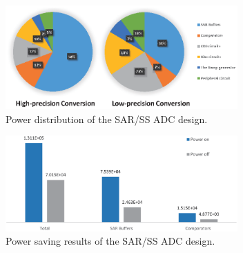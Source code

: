 \begin{figure}[htbp]
	\centerline{\includegraphics[width=3.5in]{./Figures/SARResults1.eps}}
	\caption{Power distribution of the SAR/SS ADC design.}
	\label{SARresults1}
\end{figure} 

\begin{figure}[htbp]
	\centerline{\includegraphics[width=3.5in]{./Figures/SARResults2.eps}}
	\caption{Power saving results of the SAR/SS ADC design.}
	\label{SARresults2}
\end{figure} 
